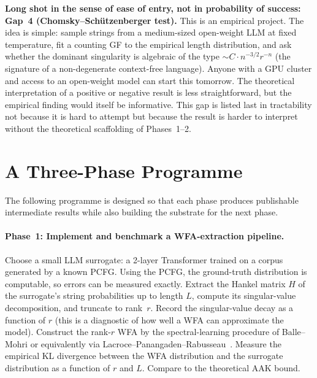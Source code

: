 \textbf{Long shot in the sense of ease of entry, not in probability of
success: Gap~4 (Chomsky--Schützenberger test).}  This is an
empirical project.  The idea is simple: sample strings from a
medium-sized open-weight LLM at fixed temperature, fit a counting GF to
the empirical length distribution, and ask whether the dominant
singularity is algebraic of the type $\sim C \cdot n^{-3/2} r^{-n}$
(the signature of a non-degenerate context-free language).  Anyone with
a GPU cluster and access to an open-weight model can start this
tomorrow.  The theoretical interpretation of a positive or negative
result is less straightforward, but the empirical finding would itself
be informative.  This gap is listed last in tractability not because it
is hard to attempt but because the result is harder to interpret without
the theoretical scaffolding of Phases~1--2.

\section{A Three-Phase Programme}
\label{ch19:threephase}

The following programme is designed so that each phase produces
publishable intermediate results while also building the substrate for
the next phase.

\paragraph{Phase~1: Implement and benchmark a WFA-extraction pipeline.}
\label{ch19:phase1}

Choose a small LLM surrogate: a 2-layer Transformer trained on a corpus
generated by a known PCFG.  Using the PCFG, the ground-truth
distribution is computable, so errors can be measured exactly.  Extract
the Hankel matrix $H$ of the surrogate's string probabilities up to
length $L$, compute its singular-value decomposition, and truncate to
rank~$r$.  Record the singular-value decay as a function of $r$ (this
is a diagnostic of how well a WFA can approximate the model).  Construct
the rank-$r$ WFA by the spectral-learning procedure of
Balle--Mohri or equivalently via Lacroce--Panangaden--Rabusseau~\cite{LacrocePanangadenRabusseau2021}.
Measure the empirical KL divergence between the WFA distribution and the
surrogate distribution as a function of $r$ and $L$.  Compare to the
theoretical AAK bound.


